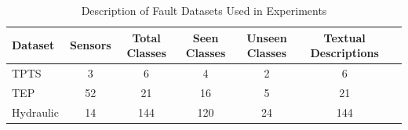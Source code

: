 \begin{table}[t]
\centering
\caption{Description of Fault Datasets Used in Experiments}
\label{tab:datasets}
\begin{tabular}{lcccccc}
\toprule
Dataset & Sensors & Total Classes & Seen Classes & Unseen Classes & Textual Descriptions \\
\midrule
TPTS & 3 & 6 & 4 & 2 & 6 \\
TEP & 52 & 21 & 16 & 5 & 21 \\
Hydraulic & 14 & 144 & 120 & 24 & 144 \\
\bottomrule
\end{tabular}
\end{table}
